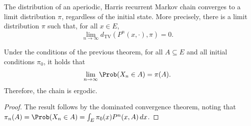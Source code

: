 \begin{theorem}
\label{thm:A.30}
The distribution of an aperiodic, Harris recurrent Markov chain converges to a limit distribution
$\pi$, regardless of the initial state.  More precisely, there is a limit distribution $\pi$ such
that, for all $x \in E$,
\[
  \lim_{n \to \infty} d_{\mathrm{TV}}(P^n(x, \cdot), \pi) = 0.
\]
\end{theorem}

\begin{corollary}
\label{cor:A.31}
Under the conditions of the previous theorem, for all $A \subseteq E$ and all initial conditions
$\pi_0$, it holds that
\[
  \lim_{n \to \infty} \Prob(X_n \in A) = \pi(A).
\]
Therefore, the chain is ergodic.
\end{corollary}

\begin{proof}
The result follows by the dominated convergence theorem, noting that
$\pi_n(A) = \Prob(X_n \in A) = \int_E \pi_0(x) P^n(x, A)\, dx$.
\end{proof}
